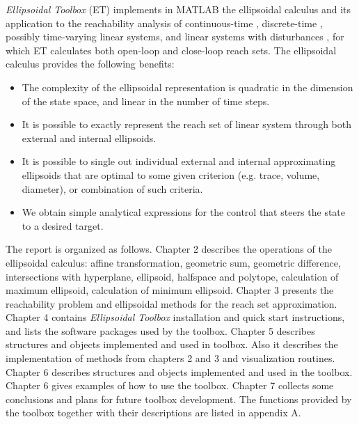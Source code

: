 {\it Ellipsoidal Toolbox} (ET) implements in MATLAB
the ellipsoidal calculus \cite{KURZHANSKI_VALYI_ELLIPSOIDAL_CALCULUS_FOR_ESTINATION_AND_CONTROL}
and its application to the reachability analysis of continuous-time
\cite{KURZHANSKI_VARAIYA_ON_ELLIPSOIDAL_TECHNIQUES_FOR_REACHABILITY_ANALYSIS}, discrete-time \cite{KURZHANSKI_VARAIYA_ELLIPSOIDAL_TECHNIQUES_FOR_REACHABILITY_ANALISYS_OF_DISCRETE_TIME_SYSTEMS}, possibly time-varying linear systems,
and linear systems with disturbances \cite{KURZHANSKI_VARAIYA_REACHABILITY_ANALYSIS_FOR_UNCERTAIN_SYSTEMS},
for which ET calculates both open-loop and close-loop reach sets.
The ellipsoidal calculus provides the following benefits:
\begin{itemize}
\item The complexity of the
ellipsoidal representation is quadratic in the dimension of
the state space, and linear in the number of time steps.
\item It is possible to exactly represent the reach set of
linear system through both external and internal ellipsoids.
\item It is possible to single out individual external and internal
approximating ellipsoids that are optimal to some given criterion
(e.g. trace, volume, diameter), or combination of such criteria.
\item We obtain simple analytical expressions for the control
that steers the state to a desired target.
\end{itemize}
The report is organized as follows.
\newline
Chapter 2 describes the operations of the
ellipsoidal calculus: affine transformation, geometric sum,
geometric difference, intersections with
hyperplane, ellipsoid, halfspace and polytope, calculation of maximum ellipsoid,
calculation of minimum ellipsoid.
\newline
Chapter 3 presents the reachability problem and ellipsoidal methods for
the reach set approximation.
\newline
Chapter 4 contains {\it Ellipsoidal Toolbox} installation and quick start
instructions, and lists the software packages used by the toolbox.
\newline
Chapter 5 describes structures and objects implemented and used in toolbox.
Also it describes the implementation of methods from chapters 2 and 3
and visualization routines.
\newline
Chapter 6 describes structures and objects implemented and
used in the toolbox.
\newline
Chapter 6 gives examples of how to use the toolbox.
\newline
Chapter 7 collects some conclusions and plans for future toolbox development.
\newline
The functions provided by the toolbox together with their descriptions
are listed in appendix A.
